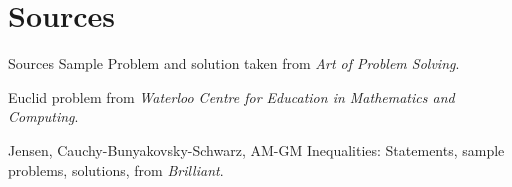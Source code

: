 \section{Sources}
\begin{namedframe}{Sources}
Sample Problem and solution taken from \textit{Art of Problem Solving}.

Euclid problem from \textit{Waterloo Centre for Education in Mathematics and Computing}.


Jensen, Cauchy-Bunyakovsky-Schwarz, AM-GM Inequalities: Statements, sample problems, solutions, from \textit{Brilliant}.
\end{namedframe}
